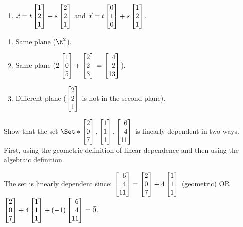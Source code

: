 \begin{exercises}
\begin{problist}
\begin{enumerate}
			\item $\vec x = t\mat{1\\2\\1}+ s\mat{2\\2\\1}$ and $\vec
			x = t\mat{0\\1\\0}+ s\mat{1\\2\\1}$.
		\end{enumerate}
		\begin{solution}
			\begin{enumerate}
				\item Same plane ($\R^2$).
				\item Same plane ($2\mat{1\\0\\5} + \mat{2\\2\\3} = \mat{4\\2\\13}$).
				\item Different plane ($\mat{2\\2\\1}$ is not in the second plane).
			\end{enumerate}
		\end{solution}
		
		\prob Show that the set $\Set*{\mat{2\\0\\7},\mat{1\\1\\1},\mat{6\\4\\11}}$
		is linearly dependent in two ways. First, using the geometric definition of linear dependence
		and then using the algebraic definition.
		\begin{solution}
			The set is linearly dependent since: $\mat{6\\4\\11}=
			\mat{2\\0\\7}+ 4\mat{1\\1\\1}$ (geometric) OR
			$\mat{2\\0\\7}+ 4\mat{1\\1\\1}+ (-1)\mat{6\\4\\11}=\vec 0$.
		\end{solution}
		

\end{problist}
\end{exercises}
